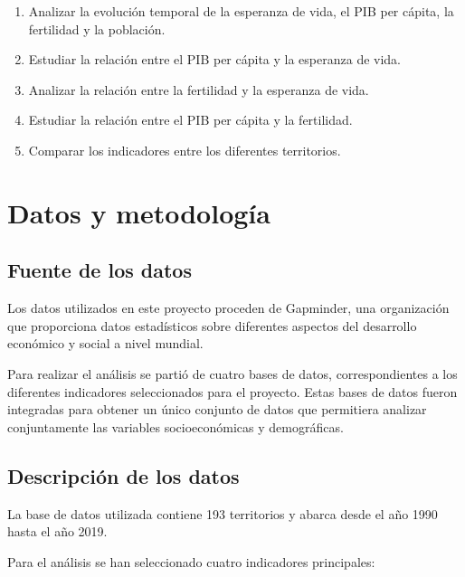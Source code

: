 \documentclass{article}
\begin{document}
\begin{enumerate}

\item Analizar la evolución temporal de la esperanza de vida,
el PIB per cápita, la fertilidad y la población.

\item Estudiar la relación entre el PIB per cápita y la esperanza de vida.

\item Analizar la relación entre la fertilidad y la esperanza de vida.

\item Estudiar la relación entre el PIB per cápita y la fertilidad.

\item Comparar los indicadores entre los diferentes territorios.

\end{enumerate}

\section{Datos y metodología}

\subsection{Fuente de los datos}

Los datos utilizados en este proyecto proceden de Gapminder, una
organización que proporciona datos estadísticos sobre diferentes aspectos
del desarrollo económico y social a nivel mundial.

Para realizar el análisis se partió de cuatro bases de datos,
correspondientes a los diferentes indicadores seleccionados para el
proyecto. Estas bases de datos fueron integradas para obtener un único
conjunto de datos que permitiera analizar conjuntamente las variables
socioeconómicas y demográficas.

\subsection{Descripción de los datos}

La base de datos utilizada contiene
193 territorios y abarca desde el año
1990 hasta el año
2019.

Para el análisis se han seleccionado cuatro indicadores principales:
\end{document}
